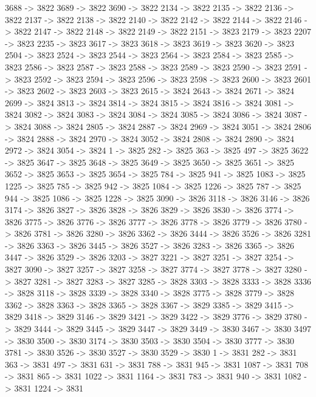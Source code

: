 {	3688 -> 3822
	3689 -> 3822
	3690 -> 3822
	2134 -> 3822
	2135 -> 3822
	2136 -> 3822
	2137 -> 3822
	2138 -> 3822
	2140 -> 3822
	2142 -> 3822
	2144 -> 3822
	2146 -> 3822
	2147 -> 3822
	2148 -> 3822
	2149 -> 3822
	2151 -> 3823
	2179 -> 3823
	2207 -> 3823
	2235 -> 3823
	3617 -> 3823
	3618 -> 3823
	3619 -> 3823
	3620 -> 3823
	2504 -> 3823
	2524 -> 3823
	2544 -> 3823
	2564 -> 3823
	2584 -> 3823
	2585 -> 3823
	2586 -> 3823
	2587 -> 3823
	2588 -> 3823
	2589 -> 3823
	2590 -> 3823
	2591 -> 3823
	2592 -> 3823
	2594 -> 3823
	2596 -> 3823
	2598 -> 3823
	2600 -> 3823
	2601 -> 3823
	2602 -> 3823
	2603 -> 3823
	2615 -> 3824
	2643 -> 3824
	2671 -> 3824
	2699 -> 3824
	3813 -> 3824
	3814 -> 3824
	3815 -> 3824
	3816 -> 3824
	3081 -> 3824
	3082 -> 3824
	3083 -> 3824
	3084 -> 3824
	3085 -> 3824
	3086 -> 3824
	3087 -> 3824
	3088 -> 3824
	2805 -> 3824
	2887 -> 3824
	2969 -> 3824
	3051 -> 3824
	2806 -> 3824
	2888 -> 3824
	2970 -> 3824
	3052 -> 3824
	2808 -> 3824
	2890 -> 3824
	2972 -> 3824
	3054 -> 3824
	1 -> 3825
	282 -> 3825
	363 -> 3825
	497 -> 3825
	3622 -> 3825
	3647 -> 3825
	3648 -> 3825
	3649 -> 3825
	3650 -> 3825
	3651 -> 3825
	3652 -> 3825
	3653 -> 3825
	3654 -> 3825
	784 -> 3825
	941 -> 3825
	1083 -> 3825
	1225 -> 3825
	785 -> 3825
	942 -> 3825
	1084 -> 3825
	1226 -> 3825
	787 -> 3825
	944 -> 3825
	1086 -> 3825
	1228 -> 3825
	3090 -> 3826
	3118 -> 3826
	3146 -> 3826
	3174 -> 3826
	3827 -> 3826
	3828 -> 3826
	3829 -> 3826
	3830 -> 3826
	3774 -> 3826
	3775 -> 3826
	3776 -> 3826
	3777 -> 3826
	3778 -> 3826
	3779 -> 3826
	3780 -> 3826
	3781 -> 3826
	3280 -> 3826
	3362 -> 3826
	3444 -> 3826
	3526 -> 3826
	3281 -> 3826
	3363 -> 3826
	3445 -> 3826
	3527 -> 3826
	3283 -> 3826
	3365 -> 3826
	3447 -> 3826
	3529 -> 3826
	3203 -> 3827
	3221 -> 3827
	3251 -> 3827
	3254 -> 3827
	3090 -> 3827
	3257 -> 3827
	3258 -> 3827
	3774 -> 3827
	3778 -> 3827
	3280 -> 3827
	3281 -> 3827
	3283 -> 3827
	3285 -> 3828
	3303 -> 3828
	3333 -> 3828
	3336 -> 3828
	3118 -> 3828
	3339 -> 3828
	3340 -> 3828
	3775 -> 3828
	3779 -> 3828
	3362 -> 3828
	3363 -> 3828
	3365 -> 3828
	3367 -> 3829
	3385 -> 3829
	3415 -> 3829
	3418 -> 3829
	3146 -> 3829
	3421 -> 3829
	3422 -> 3829
	3776 -> 3829
	3780 -> 3829
	3444 -> 3829
	3445 -> 3829
	3447 -> 3829
	3449 -> 3830
	3467 -> 3830
	3497 -> 3830
	3500 -> 3830
	3174 -> 3830
	3503 -> 3830
	3504 -> 3830
	3777 -> 3830
	3781 -> 3830
	3526 -> 3830
	3527 -> 3830
	3529 -> 3830
	1 -> 3831
	282 -> 3831
	363 -> 3831
	497 -> 3831
	631 -> 3831
	788 -> 3831
	945 -> 3831
	1087 -> 3831
	708 -> 3831
	865 -> 3831
	1022 -> 3831
	1164 -> 3831
	783 -> 3831
	940 -> 3831
	1082 -> 3831
	1224 -> 3831
}
